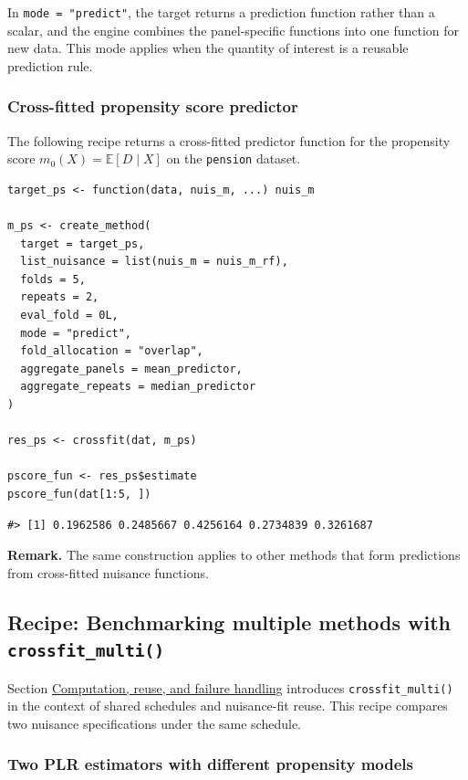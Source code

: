In \texttt{mode\ =\ "predict"}, the target returns a prediction function rather than a scalar, and the engine combines the panel-specific functions into one function for new data. This mode applies when the quantity of interest is a reusable prediction rule.

\subsubsection{Cross-fitted propensity score predictor}\label{cross-fitted-propensity-score-predictor}

The following recipe returns a cross-fitted predictor function for the propensity score \(m_0(X) = \mathbb{E}\left[D \mid X\right]\) on the \texttt{pension} dataset.

\begin{verbatim}
target_ps <- function(data, nuis_m, ...) nuis_m

m_ps <- create_method(
  target = target_ps,
  list_nuisance = list(nuis_m = nuis_m_rf),
  folds = 5,
  repeats = 2,
  eval_fold = 0L,
  mode = "predict",
  fold_allocation = "overlap",
  aggregate_panels = mean_predictor,
  aggregate_repeats = median_predictor
)

res_ps <- crossfit(dat, m_ps)

pscore_fun <- res_ps$estimate
pscore_fun(dat[1:5, ])
\end{verbatim}

\begin{verbatim}
#> [1] 0.1962586 0.2485667 0.4256164 0.2734839 0.3261687
\end{verbatim}

\textbf{Remark.} The same construction applies to other methods that form predictions from cross-fitted nuisance functions.

\subsection{\texorpdfstring{Recipe: Benchmarking multiple methods with \texttt{crossfit\_multi()}}{Recipe: Benchmarking multiple methods with crossfit\_multi()}}\label{app:multi}

Section \hyperref[subsec:performance]{Computation, reuse, and failure handling} introduces \texttt{crossfit\_multi()} in the context of shared schedules and nuisance-fit reuse. This recipe compares two nuisance specifications under the same schedule.

\subsubsection{Two PLR estimators with different propensity models}\label{two-plr-estimators-with-different-propensity-models}

